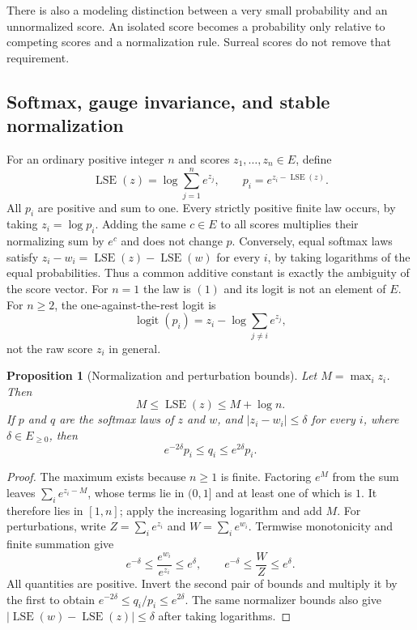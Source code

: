 \documentclass[11pt,a4paper]{article}
\numberwithin{equation}{section}
\newtheorem{proposition}[theorem]{Proposition}
\theoremstyle{definition}
\theoremstyle{remark}
\newcommand{\logit}{\operatorname{logit}}
\newcommand{\LSE}{\operatorname{LSE}}
\begin{document}
There is also a modeling distinction between a very small probability
and an unnormalized score. An isolated score becomes a probability only
relative to competing scores and a normalization rule. Surreal scores do
not remove that requirement.

\subsection{Softmax, gauge invariance, and stable normalization}

For an ordinary positive integer $n$ and scores $z_1,\ldots,z_n\in E$, define
\begin{equation}\label{fsp:eq:softmax}
 \LSE(z)=\log\sum_{j=1}^n e^{z_j},\qquad
 p_i=e^{z_i-\LSE(z)}.
\end{equation}
All $p_i$ are positive and sum to one. Every strictly positive finite
law occurs, by taking $z_i=\log p_i$. Adding the same $c\in E$ to all
scores multiplies their normalizing sum by $e^c$ and does not change $p$.
Conversely, equal softmax laws satisfy
$z_i-w_i=\LSE(z)-\LSE(w)$ for every $i$, by taking logarithms of
the equal probabilities. Thus a common additive constant is exactly the
ambiguity of the score vector. For $n=1$ the law is $(1)$ and its logit
is not an element of $E$. For $n\ge2$, the one-against-the-rest logit is
\begin{equation}
 \logit(p_i)=z_i-\log\sum_{j\ne i}e^{z_j},
\end{equation}
not the raw score $z_i$ in general.

\begin{proposition}[Normalization and perturbation bounds]
\label{fsp:prop:softbound}
Let $M=\max_i z_i$. Then
\begin{equation}
 M\le\LSE(z)\le M+\log n.
\end{equation}
If $p$ and $q$ are the softmax laws of $z$ and $w$, and
$|z_i-w_i|\le\delta$ for every $i$, where $\delta\in E_{\ge0}$, then
\begin{equation}\label{fsp:eq:softbound}
 e^{-2\delta}p_i\le q_i\le e^{2\delta}p_i.
\end{equation}
\end{proposition}
\begin{proof}
The maximum exists because $n\ge1$ is finite. Factoring $e^M$ from
the sum leaves $\sum_i e^{z_i-M}$, whose terms lie in $(0,1]$ and
at least one of which is $1$. It therefore lies in $[1,n]$; apply the
increasing logarithm and add $M$.
For perturbations, write $Z=\sum_i e^{z_i}$ and $W=\sum_i e^{w_i}$.
Termwise monotonicity and finite summation give
\[
 e^{-\delta}\le\frac{e^{w_i}}{e^{z_i}}\le e^\delta,
 \qquad e^{-\delta}\le\frac WZ\le e^\delta.
\]
All quantities are positive. Invert the second pair of bounds and
multiply it by the first to obtain
$e^{-2\delta}\le q_i/p_i\le e^{2\delta}$.
The same normalizer bounds also give
$|\LSE(w)-\LSE(z)|\le\delta$ after taking logarithms.
\end{proof}
\end{document}
